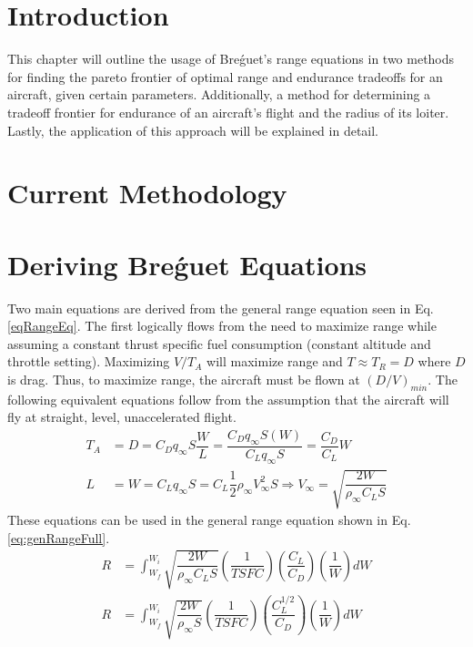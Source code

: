 \section{Introduction}
This chapter will outline the usage of Bre\'guet's range equations in two methods for finding the pareto frontier of optimal range and endurance tradeoffs for an aircraft, given certain parameters. Additionally, a method for determining a tradeoff frontier for endurance of an aircraft's flight and the radius of its loiter. Lastly, the application of this approach will be explained in detail.\par
\section{Current Methodology}
\section{Deriving Bre\'guet Equations}
Two main equations are derived from the general range equation seen in Eq. \ref{eqRangeEq}. The first logically flows from the need to maximize range while assuming a constant thrust specific fuel consumption (constant altitude and throttle setting). Maximizing $V/T_A$ will maximize range and $T \approx T_R = D$ where $D$ is drag. Thus, to maximize range, the aircraft must be flown at $(D/V)_{min}$. The following equivalent equations follow from the assumption that the aircraft will fly at straight, level, unaccelerated flight.
\begin{align}
    T_A&=D = C_Dq_{\infty}S \dfrac{W}{L} = \dfrac{C_Dq_{\infty}S(W)}{C_Lq_{\infty}S} = \dfrac{C_D}{C_L}W\\
    L &= W = C_Lq_{\infty}S = C_L\dfrac{1}{2}\rho_{\infty}V^2_{\infty}S \Rightarrow V_{\infty} = \sqrt{\dfrac{2W}{\rho_{\infty}C_LS}}
    \label{eq: VequivalentEq}
\end{align}
These equations can be used in the general range equation shown in Eq. \ref{eq:genRangeFull}.
\begin{equation}
\label{eq:genRangeFull}
    \begin{aligned}
        R &= \int_{W_f}^{W_i}\sqrt{\dfrac{2W}{\rho_{\infty}C_LS}}\left(\dfrac{1}{TSFC}\right)\left(\dfrac{C_L}{C_D}\right)\left(\dfrac{1}{W}\right)dW\\
        R &= \int_{W_f}^{W_i}\sqrt{\dfrac{2W}{\rho_{\infty}S}}\left(\dfrac{1}{TSFC}\right)\left(\dfrac{C_L^{1/2}}{C_D}\right)\left(\dfrac{1}{W}\right)dW\\
    \end{aligned}
\end{equation}
